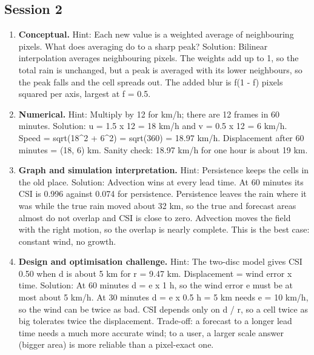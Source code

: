 \documentclass[11pt,a4paper]{article}
\begin{document}
\subsection*{Session 2}
\begin{enumerate}[nosep]
\item \textbf{Conceptual.} Hint: Each new value is a weighted average of neighbouring pixels. What does averaging do to a sharp peak? Solution: Bilinear interpolation averages neighbouring pixels. The weights add up to 1, so the total rain is unchanged, but a peak is averaged with its lower neighbours, so the peak falls and the cell spreads out. The added blur is f(1 - f) pixels squared per axis, largest at f = 0.5.
\item \textbf{Numerical.} Hint: Multiply by 12 for km/h; there are 12 frames in 60 minutes. Solution: u = 1.5 x 12 = 18 km/h and v = 0.5 x 12 = 6 km/h. Speed = sqrt(18\textasciicircum{}2 + 6\textasciicircum{}2) = sqrt(360) = 18.97 km/h. Displacement after 60 minutes = (18, 6) km. Sanity check: 18.97 km/h for one hour is about 19 km.
\item \textbf{Graph and simulation interpretation.} Hint: Persistence keeps the cells in the old place. Solution: Advection wins at every lead time. At 60 minutes its CSI is 0.996 against 0.074 for persistence. Persistence leaves the rain where it was while the true rain moved about 32 km, so the true and forecast areas almost do not overlap and CSI is close to zero. Advection moves the field with the right motion, so the overlap is nearly complete. This is the best case: constant wind, no growth.
\item \textbf{Design and optimisation challenge.} Hint: The two-disc model gives CSI 0.50 when d is about 5 km for r = 9.47 km. Displacement = wind error x time. Solution: At 60 minutes d = e x 1 h, so the wind error e must be at most about 5 km/h. At 30 minutes d = e x 0.5 h = 5 km needs e = 10 km/h, so the wind can be twice as bad. CSI depends only on d / r, so a cell twice as big tolerates twice the displacement. Trade-off: a forecast to a longer lead time needs a much more accurate wind; to a user, a larger scale answer (bigger area) is more reliable than a pixel-exact one.
\end{enumerate}
\end{document}
